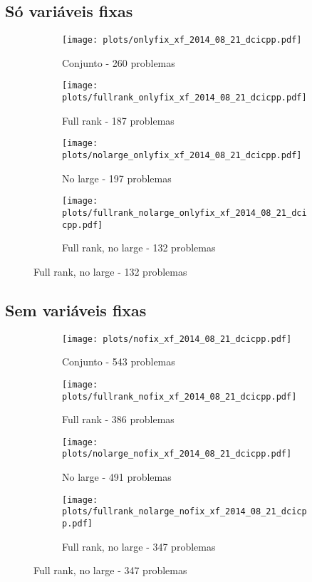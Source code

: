 \documentclass{article}
\begin{document}
\subsection{Só variáveis fixas}
\begin{figure}[H]
  \centering
  \begin{subfigure}{0.48\textwidth}
    \texttt{[image: plots/onlyfix\_xf\_2014\_08\_21\_dcicpp.pdf]}
    \caption{Conjunto - 260 problemas}
  \end{subfigure}
  \begin{subfigure}{0.48\textwidth}
    \texttt{[image: plots/fullrank\_onlyfix\_xf\_2014\_08\_21\_dcicpp.pdf]}
    \caption{Full rank - 187 problemas}
  \end{subfigure}
  \begin{subfigure}{0.48\textwidth}
    \texttt{[image: plots/nolarge\_onlyfix\_xf\_2014\_08\_21\_dcicpp.pdf]}
    \caption{No large - 197 problemas}
  \end{subfigure}
  \begin{subfigure}{0.48\textwidth}
    \texttt{[image: plots/fullrank\_nolarge\_onlyfix\_xf\_2014\_08\_21\_dcicpp.pdf]}
    \caption{Full rank, no large - 132 problemas}
  \end{subfigure}
\end{figure}

\subsection{Sem variáveis fixas}
\begin{figure}[H]
  \centering
  \begin{subfigure}{0.48\textwidth}
    \texttt{[image: plots/nofix\_xf\_2014\_08\_21\_dcicpp.pdf]}
    \caption{Conjunto - 543 problemas}
  \end{subfigure}
  \begin{subfigure}{0.48\textwidth}
    \texttt{[image: plots/fullrank\_nofix\_xf\_2014\_08\_21\_dcicpp.pdf]}
    \caption{Full rank - 386 problemas}
  \end{subfigure}
  \begin{subfigure}{0.48\textwidth}
    \texttt{[image: plots/nolarge\_nofix\_xf\_2014\_08\_21\_dcicpp.pdf]}
    \caption{No large - 491 problemas}
  \end{subfigure}
  \begin{subfigure}{0.48\textwidth}
    \texttt{[image: plots/fullrank\_nolarge\_nofix\_xf\_2014\_08\_21\_dcicpp.pdf]}
    \caption{Full rank, no large - 347 problemas}
  \end{subfigure}
\end{figure}
\end{document}
